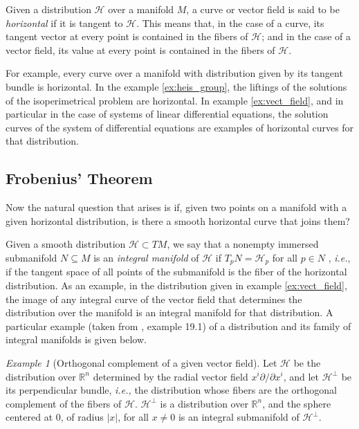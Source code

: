\documentclass[12pt, letterpaper, reqno]{amsart}
\theoremstyle{definition}
\theoremstyle{plain}
\theoremstyle{remark}
\newtheorem{ex}{Example}
\begin{document}
Given a distribution $ \mathcal{H} $  over a manifold $M$,  a curve or vector field is said to be \textit{horizontal} if it is tangent to $ \mathcal{H} $. This means that, in the case of a curve, its tangent vector at every point is contained in the fibers of $ \mathcal{H} $; and in the case of a vector field, its value at every point is contained in the fibers of $ \mathcal{H} .$   

For example, every curve over a manifold with distribution given by its tangent bundle is horizontal. In the example \ref{ex:heis_group}, the liftings of the solutions of the isoperimetrical problem are horizontal. In example \ref{ex:vect_field}, and in particular in the case of systems of linear differential equations, the solution curves of the system of differential equations are examples of horizontal curves for that distribution.

\subsection{Frobenius' Theorem}%
\label{sub:frobenius_theorem}


Now the natural question that arises is if, given two points on a manifold with a given horizontal distribution, is there a smooth horizontal curve that joins them? 

Given a smooth distribution $ \mathcal{H} \subset TM$, we say that a nonempty immersed submanifold $ N\subseteq M $  is an \textit{integral manifold} of $\mathcal{H}$ if $ T_p N = \mathcal{H}_p $ for all $ p\in N $ , \textit{i.e.}, if the tangent space of all points of the submanifold is the fiber of the horizontal distribution. As an example, in the distribution given in example \ref{ex:vect_field}, the image of any integral curve of the vector field that determines the distribution over the manifold is an integral manifold for that distribution. A particular example (taken from \cite{lee2003introduction}, example 19.1) of a distribution and its family of integral manifolds is given below.

\begin{ex}[Orthogonal complement of a given vector field]
Let $ \mathcal{H} $ be the distribution over $ \mathbb{R}^n $ determined by the radial vector field $ x^i \partial / \partial x^i $, and let $ \mathcal{H}^\perp $ be its perpendicular bundle, \textit{i.e.,} the distribution whose fibers are the orthogonal complement of the fibers of $ \mathcal{H}. $ $ \mathcal{H}^\perp $ is a distribution over $ \mathbb{R}^n  $, and the sphere centered at $0$, of radius $ |x| $, for all $ x\neq0 $ is an integral submanifold of $ \mathcal{H}^\perp. $        
\end{ex}
\end{document}
